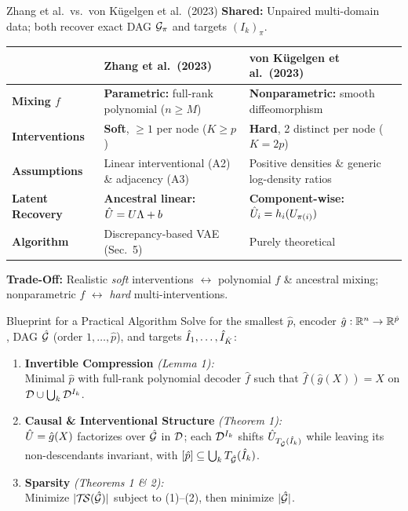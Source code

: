 \begin{frame}{Zhang et al.\ vs.\ von Kügelgen et al.\ (2023)}
  \vspace{1ex}
  \textbf{Shared:} Unpaired multi-domain data; both recover exact DAG $\mathcal{G}_\pi$ and targets $(I_k)_\pi$.
  \par\smallskip
  {\small
  \renewcommand{\arraystretch}{1.25}
  \begin{tabularx}{\textwidth}{@{}>{\bfseries}p{2.6cm}>{\raggedright\arraybackslash}X>{\raggedright\arraybackslash}X@{}}
    \toprule
    & \textbf{Zhang et al.\ (2023)} & \textbf{von Kügelgen et al.\ (2023)} \\
    \midrule
    Mixing $f$ & \textbf{Parametric:} full-rank polynomial ($n \geq M$) & \textbf{Nonparametric:} smooth diffeomorphism \\
    Interventions & \textbf{Soft}, $\geq 1$ per node ($K \geq p$) & \textbf{Hard}, 2 distinct per node ($K = 2p$) \\
    Assumptions & Linear interventional (A2) \& adjacency (A3) & Positive densities \& generic log-density ratios \\
    Latent Recovery & \textbf{Ancestral linear:} $\hat{U} = U\Lambda + b$ & \textbf{Component-wise:} $\hat{U}_i = h_i(U_{\pi(i)})$ \\
    Algorithm & Discrepancy-based VAE (Sec.~5) & Purely theoretical \\
    \bottomrule
  \end{tabularx}}
  \par\medskip
  \textbf{Trade-Off:} Realistic \emph{soft} interventions $\leftrightarrow$ polynomial $f$ \& ancestral mixing; nonparametric $f$ $\leftrightarrow$ \emph{hard} multi-interventions.
\end{frame}

\begin{frame}{Blueprint for a Practical Algorithm}
  \vspace{1ex}
  Solve for the smallest $\hat p$, encoder $\hat g : \mathbb{R}^n \to \mathbb{R}^{\hat p}$, DAG $\hat{\mathcal{G}}$ (order $1,\dots,\hat p$), and targets $\hat{I}_1,\dots,\hat{I}_{\hat K}$:
  \begin{enumerate}
    \setlength{\itemsep}{1.2ex}
    \item \textbf{Invertible Compression} \emph{(Lemma 1):}\\
      Minimal $\hat p$ with full-rank polynomial decoder $\hat f$ such that $\hat f(\hat g(X)) = X$ on $\mathcal{D} \cup \bigcup_k \mathcal{D}^{I_k}$.
    \item \textbf{Causal \& Interventional Structure} \emph{(Theorem 1):}\\
      $\hat{U} = \hat g(X)$ factorizes over $\hat{\mathcal{G}}$ in $\mathcal{D}$; each $\mathcal{D}^{I_k}$ shifts $\hat{U}_{T_{\hat{\mathcal{G}}}(\hat{I}_k)}$ while leaving its non-descendants invariant, with $[\hat p] \subseteq \bigcup_k T_{\hat{\mathcal{G}}}(\hat{I}_k)$.
    \item \textbf{Sparsity} \emph{(Theorems 1 \& 2):}\\
      Minimize $|\mathcal{T}\!\mathcal{S}(\hat{\mathcal{G}})|$ subject to (1)--(2), then minimize $|\hat{\mathcal{G}}|$.
  \end{enumerate}
\end{frame}
